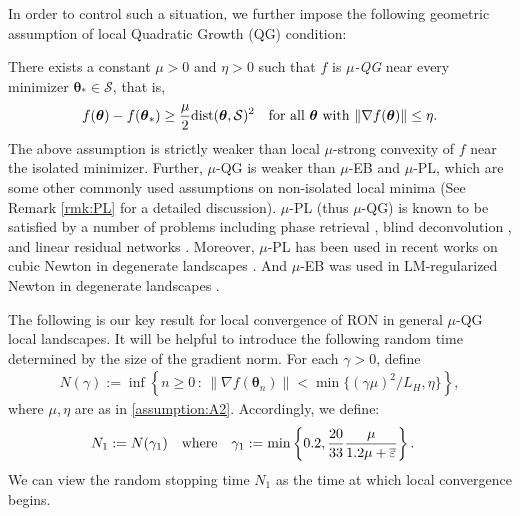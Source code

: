 \documentclass[11pt]{amsart}
\theoremstyle{plain}
\theoremstyle{definition}
\theoremstyle{remark}
\newenvironment{customassumption}[1]
{\renewcommand\theinnercustomassumption{#1}\innercustomassumption}
{\endinnercustomassumption}
\def\eps{\varepsilon}
\def\param{\boldsymbol{\theta}}
\begin{document}
In order to control such a situation, we further impose the following geometric assumption of local Quadratic Growth (QG) condition:

\begin{customassumption}{A2}[Local QG condition]\label{assumption:A2}
    There exists a constant $\mu>0$ and $\eta>0$ such that $f$ is \textit{$\mu$-QG} near every minimizer $\param_{*}\in \mathcal{S}$, that is, 
\begin{align*}
   f(\param)-f(\param_{*})\ge \frac{\mu}{2}\text{dist}(\param,\mathcal{S})^2  \quad \textup{for all $\param$ with $\| \nabla f(\param) \|\le \eta$}.
\end{align*} 
\end{customassumption}
The above assumption is strictly weaker than local $\mu$-strong convexity of $f$ near the isolated minimizer. Further, $\mu$-QG is weaker than $\mu$-EB and $\mu$-PL, which are some other commonly used assumptions on non-isolated local minima (See Remark \ref{rmk:PL} for a detailed discussion). $\mu$-PL (thus $\mu$-QG) is known to be satisfied by a number of problems including phase retrieval \cite{zhou2016geometrical}, blind deconvolution \cite{li2019rapid}, and linear residual networks \cite{hardt2016identity}. Moreover, $\mu$-PL has been used in recent works on cubic Newton in degenerate landscapes 
\cite{nesterov2006cubic,rebjock2024fast}. And $\mu$-EB was used in LM-regularized Newton in degenerate landscapes \cite{yamashita2001rate, fan2005quadratic, li2004regularized, fischer2024levenberg}. 

The following is our key result for local convergence of RON in general $\mu$-QG local landscapes. It will be helpful to introduce the following random time determined by the size of the gradient norm. For each $\gamma>0$, define 
\begin{align}\label{eq:N_gamma}
N(\gamma):=\inf\left\{n\ge 0\,:\, \|\nabla f(\param_{n})\|< \min\{ (\gamma\mu)^2/L_H, \eta \} \right\},
\end{align}
where $\mu,\eta$ are as in \ref{assumption:A2}. Accordingly, we define: 
\begin{align}\label{eq:Ni}
    N_{1} &:=N(\gamma_{1}) \quad \textup{where} \quad \gamma_{1}:=\min\left\{0.2,\frac{20}{33}\frac{\mu}{1.2\mu+\overline{\eps}}\right\}. 
\end{align}
We can view the random stopping time $N_{1}$ as the time at which local convergence begins. 
\end{document}
